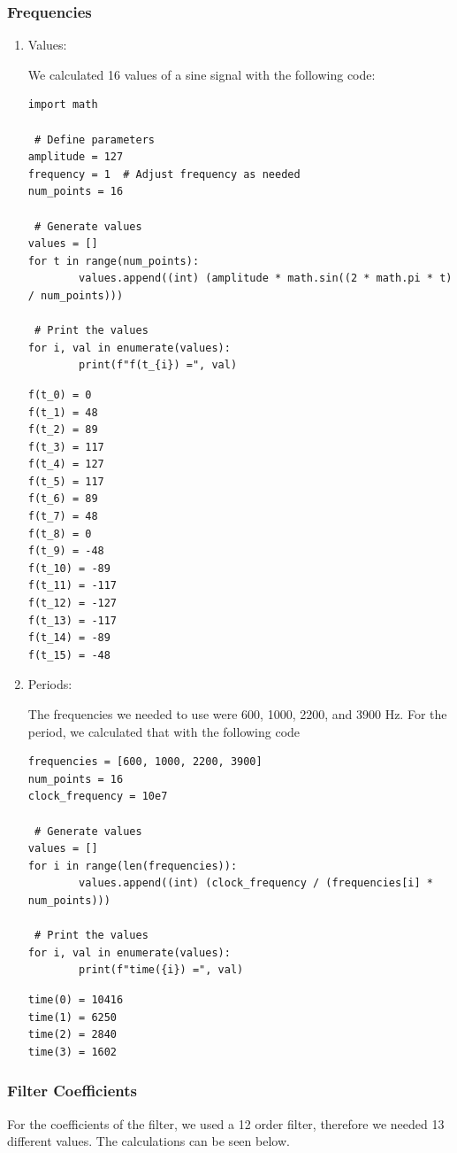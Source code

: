\documentclass[a4paper, 12pt]{article}
\begin{document}
\subsubsection{Frequencies}
\label{sec:org4cd483f}
\begin{enumerate}
\item Values:
\label{sec:orgdfa597c}

We calculated 16 values of a sine signal with the following code:

\begin{verbatim}
import math

 # Define parameters
amplitude = 127
frequency = 1  # Adjust frequency as needed
num_points = 16

 # Generate values
values = []
for t in range(num_points):
        values.append((int) (amplitude * math.sin((2 * math.pi * t) / num_points)))

 # Print the values
for i, val in enumerate(values):
        print(f"f(t_{i}) =", val)
\end{verbatim}

\begin{verbatim}
f(t_0) = 0
f(t_1) = 48
f(t_2) = 89
f(t_3) = 117
f(t_4) = 127
f(t_5) = 117
f(t_6) = 89
f(t_7) = 48
f(t_8) = 0
f(t_9) = -48
f(t_10) = -89
f(t_11) = -117
f(t_12) = -127
f(t_13) = -117
f(t_14) = -89
f(t_15) = -48
\end{verbatim}
\item Periods:
\label{sec:org2296e8b}

The frequencies we needed to use were 600, 1000, 2200, and 3900 Hz. For the period, we calculated that with the following code

\begin{verbatim}
frequencies = [600, 1000, 2200, 3900]
num_points = 16
clock_frequency = 10e7

 # Generate values
values = []
for i in range(len(frequencies)):
        values.append((int) (clock_frequency / (frequencies[i] * num_points)))

 # Print the values
for i, val in enumerate(values):
        print(f"time({i}) =", val)
\end{verbatim}

\begin{verbatim}
time(0) = 10416
time(1) = 6250
time(2) = 2840
time(3) = 1602
\end{verbatim}
\end{enumerate}
\subsubsection{Filter Coefficients}
\label{sec:org3e0147a}
For the coefficients of the filter, we used a 12 order filter, therefore we needed 13 different values. The calculations can be seen below.
\end{document}
